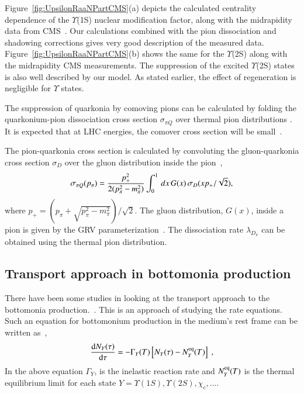 {Figure~\ref{fig:UpsilonRaaNPartCMS}(a) depicts the calculated 
centrality dependence of the $\Upsilon$(1S) nuclear
modification factor, along with the midrapidity data from CMS~\cite{Sirunyan:2018nsz}.
Our calculations combined with the pion dissociation and shadowing corrections 
gives very good description of the measured data. Figure~\ref{fig:UpsilonRaaNPartCMS}(b)
shows the same for the $\Upsilon$(2S) along with the midrapidity
CMS measurements. The suppression of the excited $\Upsilon$(2S) states 
is also well described by our model. As stated earlier, the effect of regeneration is
negligible for $\Upsilon$ states. 


  The suppression of quarkonia by comoving pions can be calculated by folding the quarkonium-pion
dissociation cross section $\sigma_{\pi Q}$ over thermal pion distributions \cite{Vogt:1988fj}. 
It is expected  that at LHC energies, the comover cross section will be small~\cite{Lourenco:2008sk}.
{\color{black}
The pion-quarkonia cross section is calculated by convoluting the gluon-quarkonia cross section $\sigma_D$
over the gluon distribution inside the pion~\cite{Arleo:2001mp},
\begin{equation}
\sigma_{\pi Q} (p_{\pi}) = {p_+^2 \over 2(p_\pi^2 - m_\pi^2)} \int_0^1 \, dx \, G(x) \, \sigma_D(xp_+/\sqrt {2}),
\end{equation}
where $p_+ = (p_\pi + \sqrt{p_\pi^2-m_\pi^2})/\sqrt{2}$. The gluon distribution, $G(x)$, inside a pion is 
given by the GRV parameterization~\cite{Gluck:1991ey}. 
The dissociation rate $\lambda_{D_{\pi}}$  can be obtained using the 
thermal pion distribution.


\subsection{Transport approach in bottomonia production }

There have been some studies in looking at the transport approach to the bottomonia 
production.~\cite{Grandchamp:2005yw,Rapp:2017chc}. This 
is an approach of studying the rate equations. Such an equation for bottomonium production  in the medium's rest frame can be written as~\cite{Grandchamp:2005yw},
\begin{equation}
\frac{\mathrm{d} N_Y(\tau)}{\mathrm{d}\tau} =
-\Gamma_Y(T)\left[N_Y(\tau)-N^{\rm eq}_Y(T)\right] \ ,
\end{equation}
In the above equation $\Gamma_Y$, is the inelastic reaction rate  and $N^{\rm eq}_Y(T)$ is the thermal equilibrium limit  for each state $Y=\Upsilon(1S), \Upsilon(2S), \chi_c, ...$.

}}
